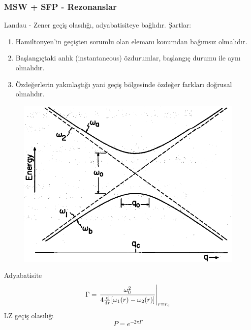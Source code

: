 \documentclass[10pt]{beamer}
\begin{document}
\begin{frame}
    \frametitle{MSW + SFP - Rezonanslar}
    Landau - Zener geçiş olasılığı, adyabatisiteye bağlıdır. Şartlar:
    \scriptsize
    \begin{enumerate}
        \item Hamiltonyen'in geçişten sorumlu olan elemanı konumdan bağımsız olmalıdır.
        \item Başlangıçtaki anlık (instantaneous) özdurumlar, başlangıç durumu ile aynı olmalıdır.
        \item Özdeğerlerin yakınlaştığı yani geçiş bölgesinde özdeğer farkları doğrusal olmalıdır.
    \end{enumerate}
    \normalsize

    \hrulefill

    \begin{minipage}{0.45\textwidth}
    \begin{figure}[hbt!]
        \centering
        \includegraphics[width=.9\textwidth]{fig/Avoid_Crossing_With_Paramters.png}
    \end{figure}
    \end{minipage}
    \hfill
    \begin{minipage}{0.45\textwidth}
        Adyabatisite
        \begin{equation*}
            \Gamma = \eval{\frac{\omega^{2}_{0}}{4 \dv{r} \qty[\omega_{1}(r)-\omega_{2}(r)]}}_{r=r_{c}}
        \end{equation*}
        LZ geçiş olasılığı
        \begin{equation*}
            P = e^{-2\pi \Gamma}
        \end{equation*}
    \end{minipage}
\end{frame}
\end{document}
